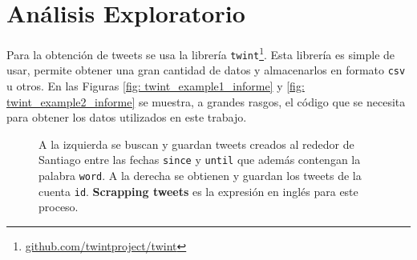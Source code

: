 \documentclass{article}
\begin{document}
\section{Análisis Exploratorio}
Para la obtención de tweets se usa la librería \texttt{twint}\footnote{\href{https://github.com/twintproject/twint}{github.com/twintproject/twint}}. Esta librería es simple de usar, permite obtener una gran cantidad de datos y almacenarlos en formato \texttt{csv} u otros. En las Figuras \ref{fig: twint_example1_informe} y \ref{fig: twint_example2_informe} se muestra, a grandes rasgos, el código que se necesita para obtener los datos utilizados en este trabajo.    


\begin{figure}[H]

	\centering
	\caption{A la izquierda se buscan y guardan tweets creados al rededor de Santiago entre las fechas \texttt{since} y \texttt{until} que además contengan la palabra \texttt{word}. A la derecha se obtienen y guardan los tweets de la cuenta \texttt{id}. \textbf{Scrapping tweets} es la expresión en inglés para este proceso.}
\end{figure}
\end{document}
